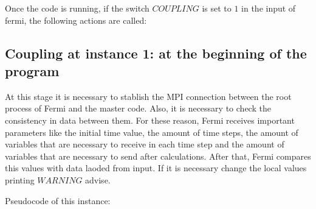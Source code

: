 Once the code is running, if the switch $COUPLING$ is set to $1$ in the input of fermi, the following actions are called:

\subsection*{Coupling at instance 1: at the beginning of the program}
At this stage it is necessary to stablish the MPI connection between the root process of Fermi and the master code.
Also, it is necessary to check the consistency in data between them.
For these reason, Fermi receives important parameters like the initial time value, 
the amount of time steps, the amount of variables that are necessary to receive in each time step and the amount of variables that are necessary to send after calculations.
After that, Fermi compares this values with data laoded from input.
If it is necessary change the local values printing $WARNING$ advise.

Pseudocode of this instance:

